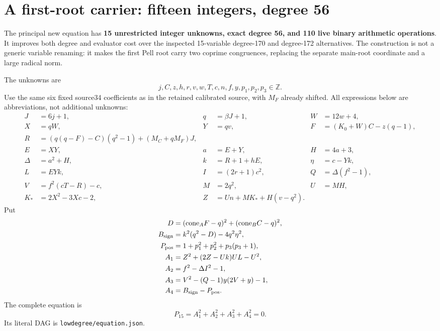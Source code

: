 \section{A first-root carrier: fifteen integers, degree 56}
\label{sec:first-carrier}
The principal new equation has \textbf{15 unrestricted integer unknowns,
exact degree 56, and 110 live binary arithmetic operations}.  It improves
both degree and evaluator cost over the inspected 15-variable degree-170
and degree-172 alternatives.  The construction is not a generic variable
renaming: it makes the first Pell root carry two coprime congruences, replacing
the separate main-root coordinate and a large radical norm.

The unknowns are
\[
 j,C,z,h,r,v,w,T,c,n,f,y,p_1,p_2,p_3\in\mathbb Z.
\]
Use the same six fixed source34 coefficients as in the retained calibrated
source, with $M_F$ already shifted.  All expressions below are abbreviations,
not additional unknowns:
\begin{align*}
 J&=6j+1,& q&=\beta J+1,& W&=12w+4,\\
 X&=qW,&Y&=qv,&F&=(K_0+W)C-z(q-1),\\
 R&=(q(q-F)-C)(q^2-1)+(M_C+qM_F)J,\\
 E&=XY,&a&=E+Y,&H&=4a+3,\\
 \Delta&=a^2+H,&k&=R+1+hE,&\eta&=c-Yk,\\
 L&=EYk,& I&=(2r+1)c^2,&Q&=\Delta(f^2-1),\\
 V&=f^2(cT-R)-c,& M&=2q^2,& U&=MH,\\
 K_*&=2X^2-3Xc-2,&Z&=Un+MK_*+H(v-q^2).
\end{align*}
Put
\begin{align*}
 D&=(\mathrm{cone}_A F-q)^2+(\mathrm{cone}_B C-q)^2,\\
 B_{\rm sign}&=k^2(q^2-D)-4q^2\eta^2,\\
 P_{\rm pos}&=1+p_1^2+p_2^2+p_3(p_3+1),\\
 A_1&=Z^2+(2Z-Uk)UL-U^2,\\
 A_2&=f^2-\Delta I^2-1,\\
 A_3&=V^2-(Q-1)y(2V+y)-1,\\
 A_4&=B_{\rm sign}-P_{\rm pos}.
\end{align*}
The complete equation is
\begin{equation}\label{eq:carrier15}
 \boxed{P_{15}=A_1^2+A_2^2+A_3^2+A_4^2=0.}
\end{equation}
Its literal DAG is \texttt{lowdegree/equation.json}.


